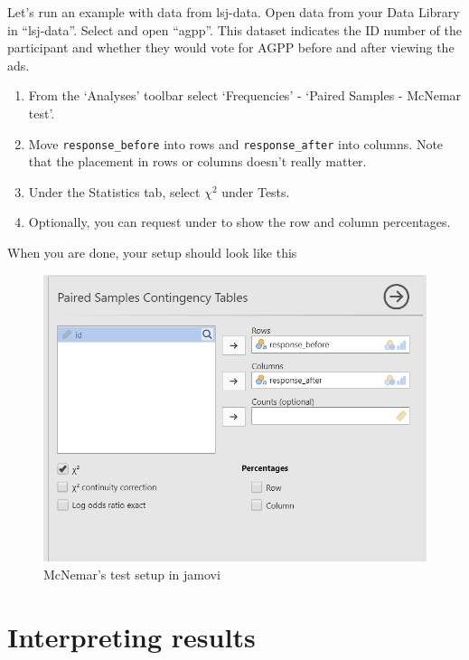 \documentclass[
]{book}
\begin{document}
Let's run an example with data from lsj-data. Open data from your Data Library in ``lsj-data''. Select and open ``agpp''. This dataset indicates the ID number of the participant and whether they would vote for AGPP before and after viewing the ads.

\begin{enumerate}
\def\labelenumi{\arabic{enumi}.}
\item
  From the `Analyses' toolbar select `Frequencies' - `Paired Samples - McNemar test'.
\item
  Move \texttt{response\_before} into rows and \texttt{response\_after} into columns. Note that the placement in rows or columns doesn't really matter.
\item
  Under the Statistics tab, select \(\chi^2\) under Tests.
\item
  Optionally, you can request under to show the row and column percentages.
\end{enumerate}

When you are done, your setup should look like this

\begin{figure}

{\centering \includegraphics[width=0.8\linewidth]{images/12-mcnemar/mcnemar_setup} 

}

\caption{McNemar's test setup in jamovi}\label{fig:unnamed-chunk-2}
\end{figure}

\hypertarget{interpreting-results-3}{%
\section{Interpreting results}\label{interpreting-results-3}}
\end{document}

